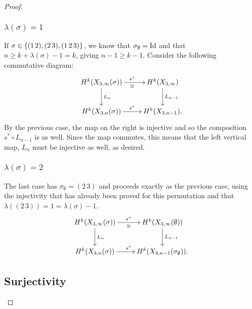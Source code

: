 \begin{proof}
\subsubsection{$\lambda(\sigma) = 1$}

If $\sigma \in \left\{ (1\,2),(2\,3),(1\,2\,3) \right\}$, we know that
$\sigma_{\emptyset} = \operatorname{Id}$ and that $n \geq k + \lambda(\sigma) - 1 =
k$, giving $n-1\geq k-1$. Consider the following commutative diagram:
\[ \xymatrix{ H^k(X_{3,\infty}(\sigma)) \ar[r]^{s^*}_{\cong}
  \ar[d]^{L_n} & 
  H^k(X_{3,\infty}) \ar[d]^{L_{n-1}} \\
  H^k(X_{3,n}(\sigma)) \ar[r]^{s^*} & H^k(X_{3,n-1}).
} \]
By the previous case, the map on the right is injective and so the
composition $s^* \circ L_{n-1}$ is as well. Since the map commutes,
this means that the left vertical map, $L_n$ must be injective as
well, as desired.

\subsubsection{$\lambda(\sigma) = 2$}

The last case has $\sigma_{\emptyset} = (2\,3)$ and proceeds exactly
as the previous case, using the injectivity that has already been
proved for this permutation and that $\lambda((2\,3)) = 1 =
\lambda(\sigma)-1$.
\[ \xymatrix{ H^k(X_{3,\infty}(\sigma)) \ar[r]^{s^*}_{\cong} \ar[d]^{L_n} &
  H^k(X_{3,\infty}(\emptyset)) \ar[d]^{L_{n-1}} \\
  H^k(X_{3,n}(\sigma)) \ar[r]^{s^*} & H^k(X_{3,n-1}(\sigma_{\emptyset})).
} \]

\subsection{Surjectivity}


\end{proof}
